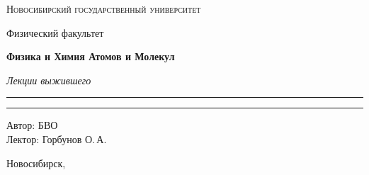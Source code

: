 \documentclass[12pt,a4paper]{report}
\begin{document}
\begin{titlepage}
    \thispagestyle{empty}

    \begin{center}
        \vspace*{1.5cm}

        {\Large\scshape Новосибирский государственный университет\par}
        \vspace{0.25cm}
        {\large Физический факультет\par}

        \vfill

        {\Huge\bfseries Физика и Химия Атомов и Молекул\par}

        \vspace{0.45cm}

        {\Large\itshape Лекции выжившего\par}

        \vspace{0.8cm}

        \rule{0.72\linewidth}{0 pt}



        \rule{2\linewidth}{0pt}

        \vfill

        \begin{flushright}
            \large
            Автор: БВО\\[0.25cm]
            Лектор: Горбунов О.\,А.
        \end{flushright}

        \vspace{1.2cm}

        {\large Новосибирск, \the\year}

    \end{center}
\end{titlepage}

\tableofcontents
\newpage



\clearpage

\clearpage
\end{document}
